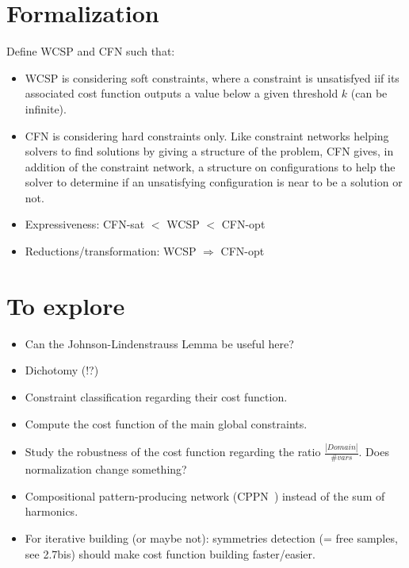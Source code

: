 \documentclass[a4paper, 12pt]{article}
\begin{document}
\section{Formalization}
Define WCSP and CFN such that:
\begin{itemize}
\item  WCSP is  considering soft  constraints, where  a constraint  is
  unsatisfyed iif its associated cost function outputs a value below a
  given threshold $k$ (can be infinite).
\item  CFN  is  considering  hard constraints  only.  Like  constraint
  networks helping solvers to find  solutions by giving a structure of
  the problem,  CFN gives,  in addition of  the constraint  network, a
  structure on  configurations to help  the solver to determine  if an
  unsatisfying configuration is near to be a solution or not.
\item Expressiveness: CFN-sat $<$ WCSP $<$ CFN-opt
\item Reductions/transformation: WCSP $\Rightarrow$ CFN-opt
\end{itemize}

\section{To explore}
\begin{itemize}
\item Can the Johnson-Lindenstrauss Lemma be useful here?
\item Dichotomy (!?)
\item Constraint classification regarding their cost function.
\item Compute the cost function of the main global constraints.
\item Study the robustness of the cost function regarding the ratio $\frac{|Domain|}{\# vars}$. Does normalization change something?
\item   Compositional  pattern-producing   network  (CPPN~\cite{CPPN})
  instead of the sum of harmonics.
\item For iterative  building (or maybe not):  symmetries detection (=
  free  samples,  see  2.7bis)  should  make  cost  function  building
  faster/easier.
\end{itemize}
\end{document}
